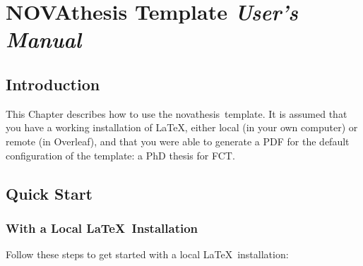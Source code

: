
%

\chapter{NOVAthesis Template \emph{User's Manual}}
\label{cha:users_manual}

\glsresetall

\begin{center}
\end{center}


\section{Introduction}
\label{sec:introduction}

This Chapter describes how to use the \gls{novathesis}\ template.  It is assumed that you have a working installation of \LaTeX, either local (in your own computer) or remote (in Overleaf), and that you were able to generate a PDF for the default configuration of the template: a PhD thesis for \gls{FCT}.


\section{Quick Start}
\label{sec:quick_started}

\subsection{With a Local \LaTeX\ Installation} %
\label{sub:with_a_local_latex_installation}

Follow these steps to get started with a local \LaTeX\ installation:

